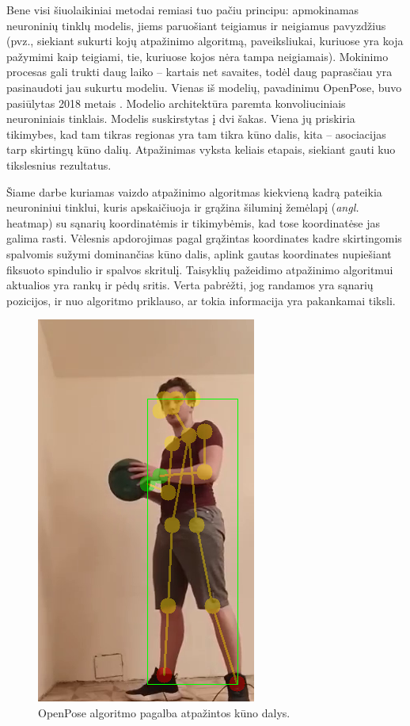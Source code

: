 \documentclass{VUMIFPSbakalaurinis}
\begin{document}
Bene visi šiuolaikiniai metodai remiasi tuo pačiu principu: apmokinamas neuroninių tinklų modelis, jiems paruošiant teigiamus ir neigiamus pavyzdžius (pvz., siekiant sukurti kojų atpažinimo algoritmą, paveiksliukai, kuriuose yra koja pažymimi kaip teigiami, tie, kuriuose kojos nėra tampa neigiamais). Mokinimo procesas gali trukti daug laiko – kartais net savaites, todėl daug paprasčiau yra pasinaudoti jau sukurtu modeliu. Vienas iš modelių, pavadinimu OpenPose, buvo pasiūlytas 2018 metais \cite{cao2019openpose}. Modelio architektūra paremta konvoliuciniais neuroniniais tinklais. Modelis suskirstytas į dvi šakas. Viena jų priskiria tikimybes, kad tam tikras regionas yra tam tikra kūno dalis, kita – asociacijas tarp skirtingų kūno dalių. Atpažinimas vyksta keliais etapais, siekiant gauti kuo tikslesnius rezultatus. 

Šiame darbe kuriamas vaizdo atpažinimo algoritmas kiekvieną kadrą pateikia neuroniniui tinklui, kuris apskaičiuoja ir grąžina šiluminį žemėlapį (\textit{angl.} heatmap) su sąnarių koordinatėmis ir tikimybėmis, kad tose koordinatėse jas galima rasti. Vėlesnis apdorojimas pagal grąžintas koordinates kadre skirtingomis spalvomis sužymi dominančias kūno dalis, aplink gautas koordinates nupiešiant fiksuoto spindulio ir spalvos skritulį. Taisyklių pažeidimo atpažinimo algoritmui aktualios yra rankų ir pėdų sritis. Verta pabrėžti, jog randamos yra sąnarių pozicijos, ir nuo algoritmo priklauso, ar tokia informacija yra pakankamai tiksli. 

\begin{figure}[H]
    \centering
    \includegraphics[scale=0.8]{img/body-parts-better}
    \caption{OpenPose algoritmo pagalba atpažintos kūno dalys.}
    \label{img:mlp}
\end{figure}
\end{document}
